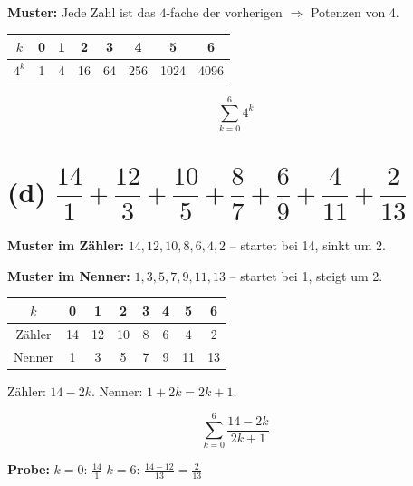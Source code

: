 \documentclass[12pt, a4paper]{article}
\begin{document}
\textbf{Muster:} Jede Zahl ist das $4$-fache der vorherigen $\Rightarrow$ Potenzen von 4.

\begin{tabular}{c|ccccccc}
    $k$ & 0 & 1 & 2 & 3 & 4 & 5 & 6 \\
    \hline
    $4^k$ & 1 & 4 & 16 & 64 & 256 & 1024 & 4096
\end{tabular}

\[
    \boxed{\sum_{k=0}^{6} 4^k}
\]

\section*{(d) $\dfrac{14}{1} + \dfrac{12}{3} + \dfrac{10}{5} + \dfrac{8}{7} + \dfrac{6}{9} + \dfrac{4}{11} + \dfrac{2}{13}$}

\textbf{Muster im Zähler:} $14, 12, 10, 8, 6, 4, 2$ -- startet bei 14, sinkt um 2.

\textbf{Muster im Nenner:} $1, 3, 5, 7, 9, 11, 13$ -- startet bei 1, steigt um 2.

\begin{tabular}{c|ccccccc}
    $k$ & 0 & 1 & 2 & 3 & 4 & 5 & 6 \\
    \hline
    Zähler & 14 & 12 & 10 & 8 & 6 & 4 & 2 \\
    Nenner & 1 & 3 & 5 & 7 & 9 & 11 & 13
\end{tabular}

Zähler: $14 - 2k$. \quad Nenner: $1 + 2k = 2k + 1$.

\[
    \boxed{\sum_{k=0}^{6} \frac{14 - 2k}{2k + 1}}
\]

\textbf{Probe:} $k = 0$: $\frac{14}{1}$ \checkmark \quad $k = 6$: $\frac{14-12}{13} = \frac{2}{13}$ \checkmark
\end{document}
